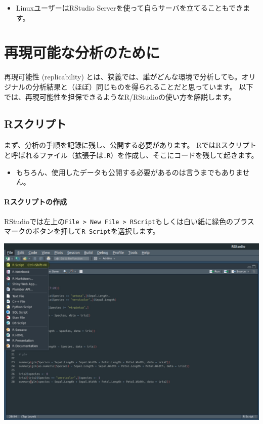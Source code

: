 \documentclass[]{bxjsreport}
\providecommand{\tightlist}{%
  \setlength{\itemsep}{0pt}\setlength{\parskip}{0pt}}
\let\oldparagraph\paragraph
\renewcommand{\paragraph}[1]{\oldparagraph{#1}\mbox{}}
\let\asdf\section
\renewcommand{\section}{\chapter}
\let\asdff\subsection
\renewcommand{\subsection}{\asdf}
\renewcommand{\subsubsection}{\asdff}
\begin{document}
\begin{itemize}
\tightlist
\item
  LinuxユーザーはRStudio Serverを使って自らサーバを立てることもできます。
\end{itemize}

\hypertarget{ux518dux73feux53efux80fdux306aux5206ux6790ux306eux305fux3081ux306b}{%
\subsection{再現可能な分析のために}\label{ux518dux73feux53efux80fdux306aux5206ux6790ux306eux305fux3081ux306b}}

再現可能性 (replicability) とは、狭義では、誰がどんな環境で分析しても。オリジナルの分析結果と（ほぼ）同じものを得られることだと思っています。
以下では、再現可能性を担保できるようなR/RStudioの使い方を解説します。

\hypertarget{rux30b9ux30afux30eaux30d7ux30c8}{%
\subsubsection{Rスクリプト}\label{rux30b9ux30afux30eaux30d7ux30c8}}

まず、分析の手順を記録に残し、公開する必要があります。
RではRスクリプトと呼ばれるファイル（拡張子は\texttt{.R}）を作成し、そこにコードを残して起きます。

\begin{itemize}
\tightlist
\item
  もちろん、使用したデータも公開する必要があるのは言うまでもありません。
\end{itemize}

\hypertarget{rux30b9ux30afux30eaux30d7ux30c8ux306eux4f5cux6210}{%
\paragraph{Rスクリプトの作成}\label{rux30b9ux30afux30eaux30d7ux30c8ux306eux4f5cux6210}}

RStudioでは左上の\texttt{File\ \textgreater{}\ New\ File\ \textgreater{}\ RScript}もしくは白い紙に緑色のプラスマークのボタンを押して\texttt{R\ Script}を選択します。

\includegraphics{figures/workflow7.jpg}
\end{document}
